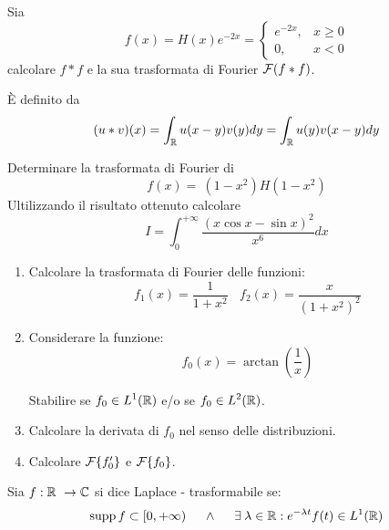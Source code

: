 Sia
\begin{equation*}
f(x) = H(x) e^{- 2x} =
\begin{cases}
e^{- 2x}, & x \geq 0\\
0, & x < 0
\end{cases}
\end{equation*}
calcolare $\displaystyle f*f$ e la sua trasformata di Fourier $\displaystyle \mathcal{F} (f*f)$.
\begin{rem}
 È definito da
\begin{equation*}
(u*v)(x) = \int_{\mathbb{R}} u(x - y) v(y) dy = \int_{\mathbb{R}} u(y) v(x - y) dy
\end{equation*}
\end{rem}
\Esercizio{}

Determinare la trasformata di Fourier di
\begin{equation*}
f(x) = \ \left(1 - x^{2}\right) H\left(1 - x^{2}\right)
\end{equation*}
Ultilizzando il risultato ottenuto calcolare
\begin{equation*}
I = \int^{+ \infty}_{0}\frac{(x\cos x - \sin x)^{2}}{x^{6}} dx
\end{equation*}
\Esercizio{}
\begin{enumerate}
\item Calcolare la trasformata di Fourier delle funzioni:
\begin{equation*}
f_{1}(x) = \frac{1}{1 + x^{2}} \ \ \ \ f_{2}(x) = \frac{x}{\left(1 + x^{2}\right)^{2}}
\end{equation*}
\item Considerare la funzione:
\begin{equation*}
f_{0}(x) = \arctan\left(\frac{1}{x}\right)
\end{equation*}

Stabilire se $\displaystyle f_{0} \in L^{1}(\mathbb{R})$ e/o se $\displaystyle f_{0} \in L^{2}(\mathbb{R})$.
\item Calcolare la derivata di $\displaystyle f_{0}$ nel senso delle distribuzioni.
\item Calcolare $\mathcal{F} \{f'_{0}\}$ e $\mathcal{F} \{f_{0}\}$.
\end{enumerate}
\Esercizio{}
\begin{defn}
Sia $\displaystyle f:\mathbb{R} \ \rightarrow \mathbb{C} $ si dice Laplace - trasformabile se:
\begin{equation*}
\supp f\subset [ 0, + \infty) \ \ \ \ \land \ \ \ \ \exists \lambda \in \RR :e^{- \lambda t} f(t) \in L^{1}(\RR)
\end{equation*}
\end{defn}
